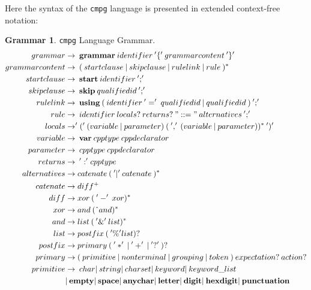 \documentclass[a4paper,oneside,11pt]{book}
\theoremstyle{definition}
\newtheorem{grmr}{Grammar}[section]
\begin{document}
\begin{flushleft}
Here the syntax of the \verb|cmpg| language is presented in extended context-free notation:

\begin{grmr}
\verb|cmpg| Language Grammar.
\begin{align*}
grammar &\rightarrow \> \textbf{grammar} \> identifier \> '\{' \> grammarcontent \> '\}'\\
grammarcontent &\rightarrow \> ( \> startclause \> | \> skipclause \> | \> rulelink \> | \> rule \> )^*\\
startclause &\rightarrow \> \textbf{start} \> identifier \> ';'\\
skipclause &\rightarrow \> \textbf{skip} \> qualifiedid \> ';'\\
rulelink &\rightarrow \> \textbf{using} \> ( \> identifier \> '=' \> qualifiedid \> | \> qualifiedid \> ) \> ';'\\
rule &\rightarrow \> identifier \> locals? \> returns? \> "::=" \> alternatives \> ';'\\
locals &\rightarrow '(' \> (variable \> | \> parameter) \>( \>',' \> (variable \> | \> parameter)) ^* \> ')'\\
variable &\rightarrow \> \textbf{var} \> cpptype \> cppdeclarator\\
parameter &\rightarrow \> cpptype \> cppdeclarator\\
returns &\rightarrow \> ':' cpptype\\
alternatives &\rightarrow catenate \> (\> '|' \> catenate \>)^*\\
catenate &\rightarrow diff^+\\
diff &\rightarrow xor \> ( \> '-' \> xor)^*\\
xor &\rightarrow and \> ( \> \hat{} \> and)^*\\
and &\rightarrow list \> (\> '\&' \> list)^*\\
list &\rightarrow postfix \> (\> '\%' list)?\\
postfix &\rightarrow primary \> ( \> '*' \> | \> '+' \> | \> '?' \>)?\\
primary &\rightarrow (\> primitive \> | \> nonterminal \> | \> grouping \> | \> token \>) \> expectation? \> action?\\
primitive &\rightarrow \> char |\> string |\> charset |\> keyword |\> keyword\_list\\
&| \> \textbf{empty} |\> \textbf{space} |\> \textbf{anychar} |\> \textbf{letter} |\> \textbf{digit} |\> \textbf{hexdigit} |\> \textbf{punctuation}\\

\end{align*}
\end{grmr}
\end{flushleft}
\end{document}
